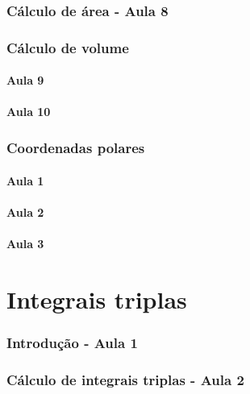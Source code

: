 \documentclass[12pt, a4paper]{article}
\begin{document}
		\section{Cálculo de área - Aula 8}
					
		\section{Cálculo de volume}
			\subsection{Aula 9}
						
			\subsection{Aula 10}
					
		\section{Coordenadas polares}		
			\subsection{Aula 1}
							
			\subsection{Aula 2}
							
			\subsection{Aula 3}
							
	\part{Integrais triplas}	
		\section{Introdução - Aula 1}
					
		\section{Cálculo de integrais triplas - Aula 2}
			
		
		
\end{document}
